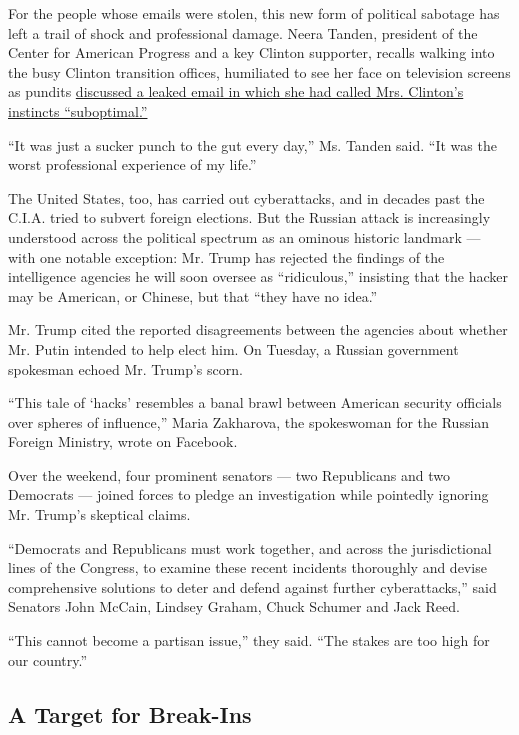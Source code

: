 For the people whose emails were stolen, this new form of political
sabotage has left a trail of shock and professional damage. Neera
Tanden, president of the Center for American Progress and a key Clinton
supporter, recalls walking into the busy Clinton transition offices,
humiliated to see her face on television screens as pundits
\href{http://www.cnn.com/2016/10/18/politics/clinton-staffers-frustrated-hillary-clinton-bill-clinton-chelsea-clinton/}{discussed
a leaked email in which she had called Mrs. Clinton's instincts
``suboptimal.''}

``It was just a sucker punch to the gut every day,'' Ms. Tanden said.
``It was the worst professional experience of my life.''

The United States, too, has carried out cyberattacks, and in decades
past the C.I.A. tried to subvert foreign elections. But the Russian
attack is increasingly understood across the political spectrum as an
ominous historic landmark --- with one notable exception: Mr. Trump has
rejected the findings of the intelligence agencies he will soon oversee
as ``ridiculous,'' insisting that the hacker may be American, or
Chinese, but that ``they have no idea.''

Mr. Trump cited the reported disagreements between the agencies about
whether Mr. Putin intended to help elect him. On Tuesday, a Russian
government spokesman echoed Mr. Trump's scorn.

``This tale of `hacks' resembles a banal brawl between American security
officials over spheres of influence,'' Maria Zakharova, the spokeswoman
for the Russian Foreign Ministry, wrote on Facebook.

Over the weekend, four prominent senators --- two Republicans and two
Democrats --- joined forces to pledge an investigation while pointedly
ignoring Mr. Trump's skeptical claims.

``Democrats and Republicans must work together, and across the
jurisdictional lines of the Congress, to examine these recent incidents
thoroughly and devise comprehensive solutions to deter and defend
against further cyberattacks,'' said Senators John McCain, Lindsey
Graham, Chuck Schumer and Jack Reed.

``This cannot become a partisan issue,'' they said. ``The stakes are too
high for our country.''

\hypertarget{a-target-for-break-ins}{%
\subsection{A Target for Break-Ins}\label{a-target-for-break-ins}}

